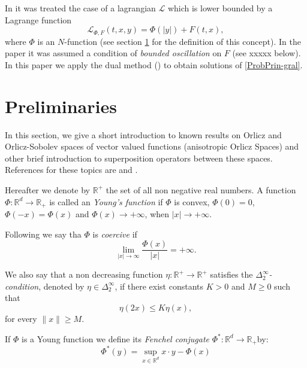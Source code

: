\documentclass[twoside]{article}
\theoremstyle{remark}
\renewcommand{\leq}{\leqslant}
\renewcommand{\geq}{\geqslant}
\begin{document}
In \cite{ABGMS2015} it was treated  the case of a lagrangian $\mathcal{L}$ which is lower bounded by a Lagrange function
\begin{equation}\label{eq:lagrange_phi}
\mathcal{L}_{\Phi,F}(t,x,y)=\Phi(|y|)+F(t,x),
\end{equation}
where  $\Phi$ is an $N$-function (see section \ref{preliminares} for the definition of this concept).  
In the paper \cite{ABGMS2015} it was assumed  a condition of \emph{bounded oscillation} on $F$  (see xxxxx below). 
In this paper  we apply the dual method (\cite[Ch. 3]{mawhin2010critical}) to obtain solutions of \eqref{ProbPrin-gral}.



\section{Preliminaries}\label{preliminares}

In this section, we give a short introduction to known results on Orlicz and Orlicz-Sobolev spaces of vector valued functions (anisotropic Orlicz Spaces) and other brief introduction to superposition operators between these spaces. References for  these topics are \cite{Orliczvectorial2005,Skaff1969, Desch2001} and
\cite{zbMATH04038592,zbMATH04009182,zbMATH03983966,zbMATH03942215}. 

Hereafter we denote  by $\mathbb{R}^+$  the set of all non negative real numbers. A function $\Phi:\mathbb{R}^d\to \mathbb{R}_+ $ is called an \emph{Young's function} if $\Phi$ is convex, $\Phi(0)=0$, $\Phi(-x)=\Phi(x)$ and $\Phi(x)\to +\infty$, when $|x|\to+\infty$.

Following \cite{Orliczvectorial2005} we say tha $\Phi$ is \emph{coercive} if
\[\lim_{|x|\to\infty}\frac{\Phi(x)}{|x|}=+\infty.\]

We also say that a non decreasing function $\eta:\mathbb{R}^+\rightarrow \mathbb{R}^+$ satisfies the  \emph{$\Delta_2^{\infty}$-condition}, denoted by $\eta \in \Delta_2^{\infty}$,
if there exist  constants $K>0$ and  $M\geq 0$ such that
\begin{equation}\label{delta2defi}\eta(2x)\leq K\eta(x),
\end{equation}
for every $\|x\|\geq M$.


If $\Phi$ is a Young function we define its \emph{Fenchel conjugate}   $\Phi^*:\mathbb{R}^d\to \mathbb{R}_+ $by:
\begin{equation}\label{eq:conjugada}
 \Phi^*(y)=\sup\limits_{x\in\mathbb{R}^d} x\cdot y-\Phi(x)
\end{equation}
\end{document}

